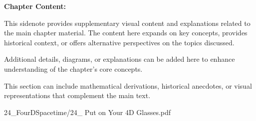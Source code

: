 \begin{SideNotePage}{
  \textbf{Chapter Content:} \par
  This sidenote provides supplementary visual content and explanations related to the main chapter material. The content here expands on key concepts, provides historical context, or offers alternative perspectives on the topics discussed.

  \vspace{0.5em}
  Additional details, diagrams, or explanations can be added here to enhance understanding of the chapter's core concepts.

  \vspace{0.5em}
  This section can include mathematical derivations, historical anecdotes, or visual representations that complement the main text.
}{24_FourDSpacetime/24_ Put on Your 4D Glasses.pdf}
\end{SideNotePage}
